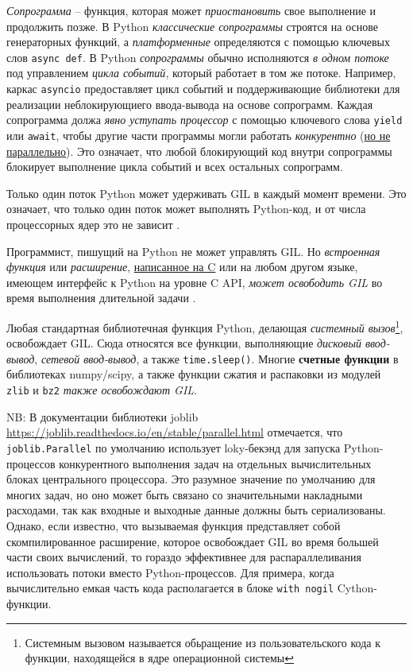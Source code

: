 \documentclass[%
	11pt,
	a4paper,
	utf8,
		]{article}
\begin{document}
\emph{Сопрограмма} -- функция, которая может \emph{приостановить} свое выполнение и продолжить позже. В Python \emph{классические сопрограммы} строятся на основе генераторных функций, а \emph{платформенные} определяются с помощью ключевых слов \verb|async def|. В Python \emph{сопрограммы} обычно исполняются \emph{в одном потоке} под управлением \emph{цикла событий}, который работает в том же потоке. Например, каркас \verb|asyncio| предоставляет цикл событий и поддерживающие библиотеки для реализации неблокирующиего ввода-вывода на основе сопрограмм. {\color{blue}Каждая сопрограмма должа \emph{явно уступать процессор} с помощью ключевого слова \verb*|yield| или \verb|await|, чтобы другие части программы могли работать \emph{конкурентно} (\underline{но не параллельно})}. Это означает, что любой блокирующий код внутри сопрограммы блокирует выполнение цикла событий и всех остальных сопрограмм.

Только один поток Python может удерживать GIL в каждый момент времени. Это означает, что только один поток может выполнять Python-код, и от числа процессорных ядер это не зависит \cite[]{ramalho:python-2022}.

Программист, пишущий на Python не может управлять GIL. Но \emph{встроенная функция} или \emph{расширение}, \underline{написанное на C} или на любом другом языке, имеющем интерфейс к Python на уровне C API, \emph{может освободить GIL} во время выполнения длительной задачи \cite[]{ramalho:python-2022}.

{\color{blue}
Любая стандартная библиотечная функция Python, делающая \emph{системный вызов}\footnote{Системным вызовом называется обьращение из пользовательского кода к функции, находящейся в ядре операционной системы}, освобождает GIL. Сюда относятся все функции, выполняющие \emph{дисковый ввод-вывод}, \emph{сетевой ввод-вывод}, а также \verb*|time.sleep()|. Многие \textbf{счетные функции} в библиотеках numpy/scipy, а также функции сжатия и распаковки из модулей \verb|zlib| и \verb*|bz2| \emph{также освобождают GIL}.
}

NB: В документации библиотеки joblib \url{https://joblib.readthedocs.io/en/stable/parallel.html} отмечается, что \verb|joblib.Parallel| по умолчанию использует loky-бекэнд для запуска Python-процессов конкурентного выполнения задач на отдельных вычислительных блоках центрального процессора. Это разумное значение по умолчанию для многих задач, но оно может быть связано со значительными накладными расходами, так как входные и выходные данные должны быть сериализованы. {\color{blue}Однако, если известно, что вызываемая функция представляет собой скомпилированное расширение, которое освобождает GIL во время большей части своих вычислений, то гораздо эффективнее для распараллеливания использовать потоки вместо Python-процессов.} Для примера, когда вычислительно емкая часть кода располагается в блоке \verb|with nogil| Cython-функции.
\end{document}
